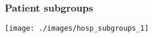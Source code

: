 \begin{frame}
\frametitle{Patient subgroups}

\begin{center}
\texttt{[image: ./images/hosp\_subgroups\_1]}
\end{center}

\end{frame}

